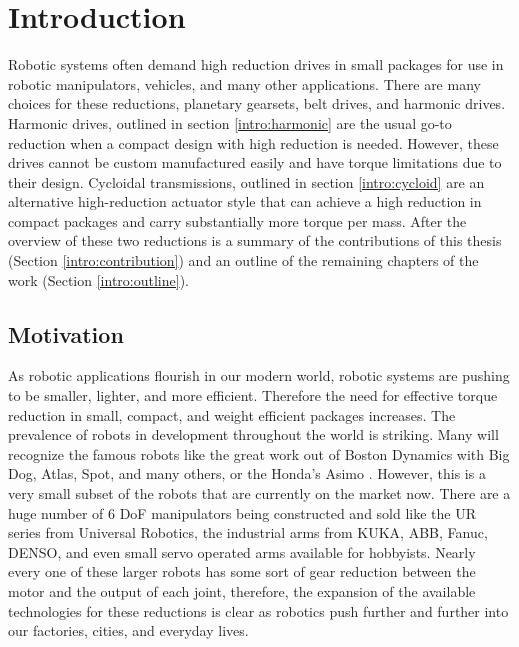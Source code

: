 
\chapter{Introduction}\label{ch:intro}
Robotic systems often demand high reduction drives in small packages for use in robotic manipulators, vehicles, and many other applications. There are many choices for these reductions, planetary gearsets, belt drives, and harmonic drives. Harmonic drives, outlined in section \ref{intro:harmonic} are the usual go-to reduction when a compact design with high reduction is needed. However, these drives cannot be custom manufactured easily and have torque limitations due to their design. Cycloidal transmissions, outlined in section \ref{intro:cycloid} are an alternative high-reduction actuator style that can achieve a high reduction in compact packages and carry substantially more torque per mass. After the overview of these two reductions is a summary of the contributions of this thesis (Section \ref{intro:contribution}) and an outline of the remaining chapters of the work (Section \ref{intro:outline}). 

\section{Motivation} \label{intro:motivation}

As robotic applications flourish in our modern world, robotic systems are pushing to be smaller, lighter, and more efficient. 
Therefore the need for effective torque reduction in small, compact, and weight efficient packages increases. 
The prevalence of robots in development throughout the world is striking. 
Many will recognize the famous robots like the great work out of Boston Dynamics with Big Dog, Atlas, Spot, and many others, or the Honda's Asimo \cite{ref:asimo}.
However, this is a very small subset of the robots that are currently on the market now. 
There are a huge number of 6 DoF manipulators being constructed and sold like the UR series from Universal Robotics, the industrial arms from KUKA, ABB, Fanuc, DENSO, and even small servo operated arms available for hobbyists. 
Nearly every one of these larger robots has some sort of gear reduction between the motor and the output of each joint, therefore, the expansion of the available technologies for these reductions is clear as robotics push further and further into our factories, cities, and everyday lives. 

